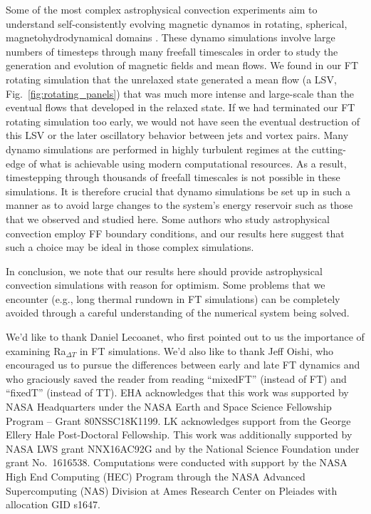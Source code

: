 \documentclass[aps, pre, onecolumn, nofootinbib, notitlepage, groupedaddress, amsfonts, amssymb, amsmath, longbibliography, superscriptaddress]{revtex4-1}
\begin{document}
Some of the most complex astrophysical convection experiments aim to understand self-consistently evolving magnetic dynamos in rotating, spherical, magnetohydrodynamical domains \cite{brown&all2010, yadav&all2016, strugarek&all2017, strugarek&all2018}.
These dynamo simulations involve large numbers of timesteps through many freefall timescales in order to study the generation and evolution of magnetic fields and mean flows.
We found in our FT rotating simulation that the unrelaxed state generated a mean flow (a LSV, Fig.~\ref{fig:rotating_panels}) that was much more intense and large-scale than the eventual flows that developed in the relaxed state.
If we had terminated our FT rotating simulation too early, we would not have seen the eventual destruction of this LSV or the later oscillatory behavior between jets and vortex pairs.
Many dynamo simulations are performed in highly turbulent regimes at the cutting-edge of what is achievable using modern computational resources.
As a result, timestepping through thousands of freefall timescales is not possible in these simulations.
It is therefore crucial that dynamo simulations be set up in such a manner as to avoid large changes to the system's energy reservoir such as those that we observed and studied here.
Some authors who study astrophysical convection \citep{featherstone&hindman2016a, strugarek&all2018, bordwell&all2018, matilsky&all2019} employ FF boundary conditions, and our results here suggest that such a choice may be ideal in those complex simulations.

In conclusion, we note that our results here should provide astrophysical convection simulations with reason for optimism.
Some problems that we encounter (e.g., long thermal rundown in FT simulations) can be completely avoided through a careful understanding of the numerical system being solved.

\begin{acknowledgments}
We'd like to thank Daniel Lecoanet, who first pointed out to us the importance of examining Ra$_{\Delta T}$ in FT simulations. 
We'd also like to thank Jeff Oishi, who encouraged us to pursue the differences between early and late FT dynamics and who graciously saved the reader from reading ``mixedFT'' (instead of FT) and ``fixedT'' (instead of TT).
EHA acknowledges that this work was supported by NASA Headquarters under the NASA Earth and Space Science Fellowship Program -- Grant 80NSSC18K1199.
LK acknowledges support from the George Ellery Hale Post-Doctoral Fellowship.
This work was additionally supported by NASA LWS grant NNX16AC92G and by the National Science Foundation under grant No.~1616538. 
Computations were conducted with support by the NASA High End Computing (HEC) Program through the NASA  Advanced Supercomputing (NAS) Division at Ames Research Center on Pleiades with allocation GID s1647.
\end{acknowledgments}
\end{document}
